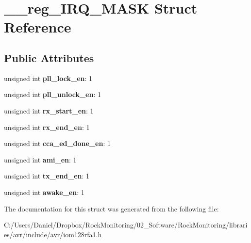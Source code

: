 \hypertarget{struct____reg___i_r_q___m_a_s_k}{}\section{\+\_\+\+\_\+reg\+\_\+\+I\+R\+Q\+\_\+\+M\+A\+SK Struct Reference}
\label{struct____reg___i_r_q___m_a_s_k}
\subsection*{Public Attributes}
\begin{DoxyCompactItemize}
\item 
unsigned int {\bfseries pll\+\_\+lock\+\_\+en}\+: 1\hypertarget{struct____reg___i_r_q___m_a_s_k_ab7f3aec47f0d17166ba30cc081a2cd70}{}\label{struct____reg___i_r_q___m_a_s_k_ab7f3aec47f0d17166ba30cc081a2cd70}

\item 
unsigned int {\bfseries pll\+\_\+unlock\+\_\+en}\+: 1\hypertarget{struct____reg___i_r_q___m_a_s_k_aee11454c5b308f80d7beeb3d29707d51}{}\label{struct____reg___i_r_q___m_a_s_k_aee11454c5b308f80d7beeb3d29707d51}

\item 
unsigned int {\bfseries rx\+\_\+start\+\_\+en}\+: 1\hypertarget{struct____reg___i_r_q___m_a_s_k_a03b0e28dfb91a6721319934a6582aa3f}{}\label{struct____reg___i_r_q___m_a_s_k_a03b0e28dfb91a6721319934a6582aa3f}

\item 
unsigned int {\bfseries rx\+\_\+end\+\_\+en}\+: 1\hypertarget{struct____reg___i_r_q___m_a_s_k_ab3d305bf6856fce4f9de7f51c90d76c2}{}\label{struct____reg___i_r_q___m_a_s_k_ab3d305bf6856fce4f9de7f51c90d76c2}

\item 
unsigned int {\bfseries cca\+\_\+ed\+\_\+done\+\_\+en}\+: 1\hypertarget{struct____reg___i_r_q___m_a_s_k_ae81ad82546f10a8d41ba064be8cf2768}{}\label{struct____reg___i_r_q___m_a_s_k_ae81ad82546f10a8d41ba064be8cf2768}

\item 
unsigned int {\bfseries ami\+\_\+en}\+: 1\hypertarget{struct____reg___i_r_q___m_a_s_k_a34ffeddba43677019e44ca16c5e5416c}{}\label{struct____reg___i_r_q___m_a_s_k_a34ffeddba43677019e44ca16c5e5416c}

\item 
unsigned int {\bfseries tx\+\_\+end\+\_\+en}\+: 1\hypertarget{struct____reg___i_r_q___m_a_s_k_a16ca55b0da84eb383753e2820c604b43}{}\label{struct____reg___i_r_q___m_a_s_k_a16ca55b0da84eb383753e2820c604b43}

\item 
unsigned int {\bfseries awake\+\_\+en}\+: 1\hypertarget{struct____reg___i_r_q___m_a_s_k_ae8435b98335aff636b3758d1f4a30a66}{}\label{struct____reg___i_r_q___m_a_s_k_ae8435b98335aff636b3758d1f4a30a66}

\end{DoxyCompactItemize}


The documentation for this struct was generated from the following file\+:\begin{DoxyCompactItemize}
\item 
C\+:/\+Users/\+Daniel/\+Dropbox/\+Rock\+Monitoring/02\+\_\+\+Software/\+Rock\+Monitoring/libraries/avr/include/avr/iom128rfa1.\+h\end{DoxyCompactItemize}
